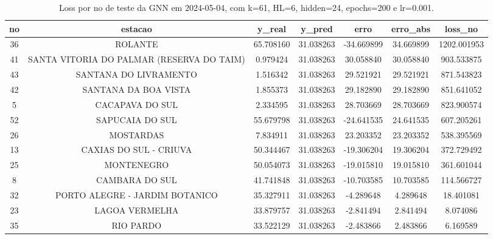 \begin{table}[h]
\centering
\caption{Loss por no de teste da GNN em 2024-05-04, com k=61, HL=6, hidden=24, epochs=200 e lr=0.001.}
\label{tab:gnn_loss_k61_hl6_h24_e200_d20240504}
\begin{tabular}{ccccccc}
\toprule
no & estacao & y\_real & y\_pred & erro & erro\_abs & loss\_no \\
\midrule
36 & ROLANTE & 65.708160 & 31.038263 & -34.669899 & 34.669899 & 1202.001953 \\
41 & SANTA VITORIA DO PALMAR (RESERVA DO TAIM) & 0.979424 & 31.038263 & 30.058840 & 30.058840 & 903.533875 \\
43 & SANTANA DO LIVRAMENTO & 1.516342 & 31.038263 & 29.521921 & 29.521921 & 871.543823 \\
42 & SANTANA DA BOA VISTA & 1.855373 & 31.038263 & 29.182890 & 29.182890 & 851.641052 \\
5 & CACAPAVA DO SUL & 2.334595 & 31.038263 & 28.703669 & 28.703669 & 823.900574 \\
52 & SAPUCAIA DO SUL & 55.679798 & 31.038263 & -24.641535 & 24.641535 & 607.205261 \\
26 & MOSTARDAS & 7.834911 & 31.038263 & 23.203352 & 23.203352 & 538.395569 \\
13 & CAXIAS DO SUL - CRIUVA & 50.344467 & 31.038263 & -19.306204 & 19.306204 & 372.729492 \\
25 & MONTENEGRO & 50.054073 & 31.038263 & -19.015810 & 19.015810 & 361.601044 \\
8 & CAMBARA DO SUL & 41.741848 & 31.038263 & -10.703585 & 10.703585 & 114.566727 \\
32 & PORTO ALEGRE - JARDIM BOTANICO & 35.327911 & 31.038263 & -4.289648 & 4.289648 & 18.401081 \\
23 & LAGOA VERMELHA & 33.879757 & 31.038263 & -2.841494 & 2.841494 & 8.074086 \\
35 & RIO PARDO & 33.522129 & 31.038263 & -2.483866 & 2.483866 & 6.169589 \\
\bottomrule
\end{tabular}
\end{table}
